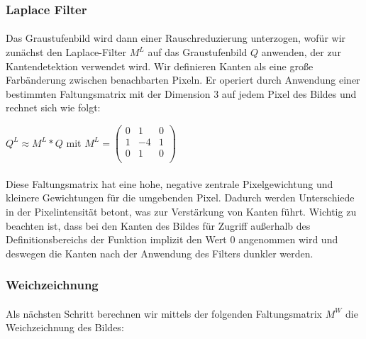 \documentclass[course=erap]{aspdoc}
\begin{document}
\subsubsection*{Laplace Filter}

\paragraph{}
Das Graustufenbild wird dann einer Rauschreduzierung unterzogen, wofür wir zunächst den Laplace-Filter \(M^L\) auf 
das Graustufenbild \(Q\) anwenden, der zur Kantendetektion verwendet wird. Wir definieren Kanten als eine große 
Farbänderung zwischen benachbarten Pixeln. Er operiert durch Anwendung einer bestimmten Faltungsmatrix mit der
 Dimension 3 auf jedem Pixel des Bildes und rechnet sich wie folgt:

\begin{center}
    \(Q^L \approx M^L * Q\)
        mit
    \(M^L = \begin{pmatrix} 
                0 & 1 & 0 \\
                1 & -4 & 1 \\
                0 & 1 & 0 \\
            \end{pmatrix}\)
\end{center}

\paragraph{}
Diese Faltungsmatrix hat eine hohe, negative zentrale Pixelgewichtung und kleinere Gewichtungen für 
die umgebenden Pixel. Dadurch werden Unterschiede in der Pixelintensität betont, was zur Verstärkung 
von Kanten führt. Wichtig zu beachten ist, dass bei den Kanten des Bildes für Zugriff außerhalb des 
Definitionsbereichs der Funktion implizit den Wert 0 angenommen wird und deswegen die Kanten nach
 der Anwendung des Filters dunkler werden.


\subsubsection*{Weichzeichnung}

\paragraph{}
Als nächsten Schritt berechnen wir mittels der folgenden Faltungsmatrix \(M^W\) die Weichzeichnung des Bildes:
\end{document}
